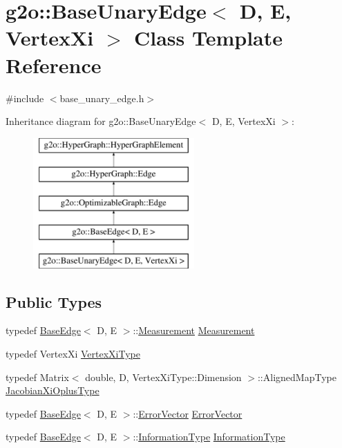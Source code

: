 \hypertarget{classg2o_1_1_base_unary_edge}{}\section{g2o\+:\+:Base\+Unary\+Edge$<$ D, E, Vertex\+Xi $>$ Class Template Reference}
\label{classg2o_1_1_base_unary_edge}


{\ttfamily \#include $<$base\+\_\+unary\+\_\+edge.\+h$>$}

Inheritance diagram for g2o\+:\+:Base\+Unary\+Edge$<$ D, E, Vertex\+Xi $>$\+:\begin{figure}[H]
\begin{center}
\leavevmode
\includegraphics[height=5.000000cm]{classg2o_1_1_base_unary_edge}
\end{center}
\end{figure}
\subsection*{Public Types}
\begin{DoxyCompactItemize}
\item 
typedef \mbox{\hyperlink{classg2o_1_1_base_edge}{Base\+Edge}}$<$ D, E $>$\+::\mbox{\hyperlink{classg2o_1_1_base_edge_a2c148abba650a20b8c7eed75d3e2211e}{Measurement}} \mbox{\hyperlink{classg2o_1_1_base_unary_edge_ab953b076b4c35fcf99de02bd0bfcc1ae}{Measurement}}
\item 
typedef Vertex\+Xi \mbox{\hyperlink{classg2o_1_1_base_unary_edge_a503e62e74775172c008135650850d511}{Vertex\+Xi\+Type}}
\item 
typedef Matrix$<$ double, D, Vertex\+Xi\+Type\+::\+Dimension $>$\+::Aligned\+Map\+Type \mbox{\hyperlink{classg2o_1_1_base_unary_edge_a24bcabd661223e15b7337f2835310f5e}{Jacobian\+Xi\+Oplus\+Type}}
\item 
typedef \mbox{\hyperlink{classg2o_1_1_base_edge}{Base\+Edge}}$<$ D, E $>$\+::\mbox{\hyperlink{classg2o_1_1_base_edge_af5b558dd24e4be2e437563cae4b3550d}{Error\+Vector}} \mbox{\hyperlink{classg2o_1_1_base_unary_edge_abc04cfacb65fc72825156f1b3346dd48}{Error\+Vector}}
\item 
typedef \mbox{\hyperlink{classg2o_1_1_base_edge}{Base\+Edge}}$<$ D, E $>$\+::\mbox{\hyperlink{classg2o_1_1_base_edge_a2e5a33343ac3f189d8a7d5ee4d8b73fc}{Information\+Type}} \mbox{\hyperlink{classg2o_1_1_base_unary_edge_a6753caa95c30fa5bb3887e2a30892ff3}{Information\+Type}}
\end{DoxyCompactItemize}
